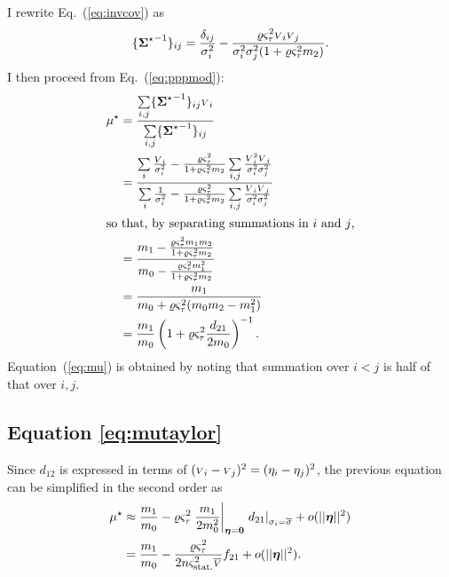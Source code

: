 \documentclass{pasa}
\begin{document}
I rewrite Eq.~(\ref{eq:invcov}) as 
\begin{equation*}
    \{ {\boldsymbol{\Sigma}^\star}^{-1} \}_{ij} = \frac{\delta_{ij}}{\sigma_i^2}
         - \frac{\varrho\varsigma_\tau^2{\scriptstyle V}_i{\scriptstyle V}_j}
                {\sigma_i^2\sigma_j^2(1 + \varrho\varsigma_\tau^2 m_2)}.
\end{equation*}
I then proceed from Eq.~(\ref{eq:pppmod}):
\begin{align*}
    \mu^\star &= \frac{\sum\limits_{i,j} \{ {\boldsymbol{\Sigma}^\star}^{-1} \}_{ij} {\scriptstyle V}_i} 
                       {\sum\limits_{i,j} \{ {\boldsymbol{\Sigma}^\star}^{-1} \}_{ij} }\\
               &= \frac{\sum\limits_i \frac{{\scriptstyle V}_i}{\sigma_i^2}
                     -  \frac{\varrho\varsigma_\tau^2}{1+ \varrho\varsigma_\tau^2m_2} 
                \sum\limits_{i,j} \frac{{\scriptstyle V}_i^2{\scriptstyle V}_j}{\sigma_i^2\sigma_j^2}}
                  {\sum\limits_i \frac 1{\sigma_i^2}
                     -  \frac{\varrho\varsigma_\tau^2}{1+ \varrho\varsigma_\tau^2m_2} 
                \sum\limits_{i,j} \frac{{\scriptstyle V}_i{\scriptstyle V}_j}{\sigma_i^2\sigma_j^2}}\\
\intertext{so that, by separating summations in $i$ and $j$,}
               &= \frac
                   {m_1-\frac{\varrho\varsigma_\tau^2m_1m_2}{1 + \varrho\varsigma_\tau^2 m_2}}
                   {m_0-\frac{\varrho\varsigma_\tau^2 m_1^2}{1 + \varrho\varsigma_\tau^2 m_2}}\\
               &= \frac{m_1}{m_0 + \varrho\varsigma_\tau^2(m_0m_2 - m_1^2)}\\
               &= \frac{m_1}{m_0} \left( 1 + \varrho\varsigma_\tau^2\frac{d_{21}}{2m_0} \right)^{-1}.
\end{align*}
Equation~(\ref{eq:mu}) is obtained by noting that summation over $i < j$ is
half of that over $i, j$.

\subsection{Equation \ref{eq:mutaylor}}
\label{ap:mutaylor}

Since $d_{12}$ is expressed in terms of $({\scriptstyle V}_i - {\scriptstyle V}_j)^2 = (\eta_i - \eta_j)^2$, the previous equation can be simplified in the second order as
\begin{align*}
    \mu^\star &\approx \frac{m_1}{m_0} 
                - \varrho\varsigma_\tau^2
                    \left.  \frac{m_1}{2m_0^2} \right|_{\boldsymbol{\eta} = \boldsymbol{0}} 
                    \left. d_{21}\right|_{\sigma_i = \overline{\sigma}} 
                + o(||\boldsymbol{\eta}||^2)\\
               &= \frac{m_1}{m_0} - \frac{\varrho\varsigma_\tau^2}{2n\varsigma_\text{stat.}^2\overline{{\scriptstyle V}}}  f_{21} + o(||\boldsymbol{\eta}||^2).
\end{align*}
\end{document}
